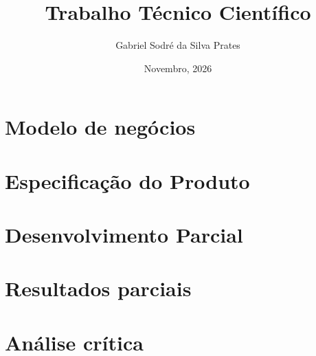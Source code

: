 \documentclass[
	12pt,				%
	openright,			%
	oneside,			%
	a4paper,			%
	chapter=TITLE,		%
	section=TITLE,		%
	english,			%
	brazil,				%
	]{styles/abntex2}
\title{Trabalho Técnico Científico}
\author{Gabriel Sodré da Silva Prates}
\date{Novembro, 2026}
\begin{document}
\pretextual
 \clearpage


\textual %
\chapter{Modelo de negócios}


\chapter{Especificação do Produto}


\chapter{Desenvolvimento Parcial}


\chapter{Resultados parciais}


\chapter{Análise crítica}


\pagestyle{simple} %



\postextual




\end{document}
